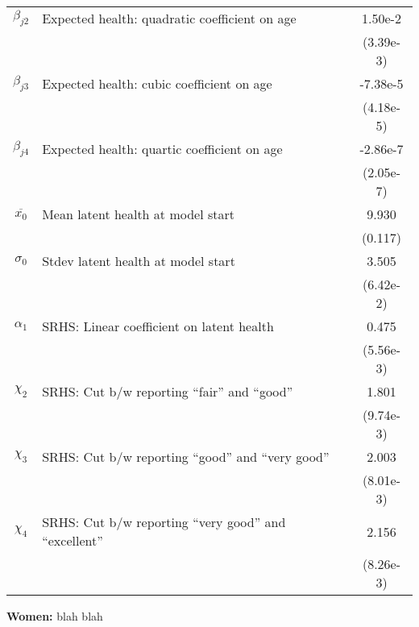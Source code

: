 \begin{table}
\begin{center}
{\begin{tabular}{clc}
$\beta_{j2}$ & Expected health: quadratic coefficient on age & 1.50e-2 \\
 & & (3.39e-3) \\
$\beta_{j3}$ & Expected health: cubic coefficient on age & -7.38e-5 \\
 & & (4.18e-5) \\
$\beta_{j4}$ & Expected health: quartic coefficient on age & -2.86e-7 \\
 & & (2.05e-7) \\
$\overline{x_0}$ & Mean latent health at model start & 9.930 \\
 & & (0.117) \\
$\sigma_{0}$ & Stdev latent health at model start & 3.505 \\
 & & (6.42e-2) \\
$\alpha_1$ & SRHS: Linear coefficient on latent health & 0.475 \\
 & & (5.56e-3) \\
$\chi_2$ & SRHS: Cut b/w reporting ``fair'' and ``good'' & 1.801 \\
 & & (9.74e-3) \\
$\chi_3$ & SRHS: Cut b/w reporting ``good'' and ``very good'' & 2.003 \\
 & & (8.01e-3) \\
$\chi_4$ & SRHS: Cut b/w reporting ``very good'' and ``excellent'' & 2.156 \\
 & & (8.26e-3) \\
\hline\hline
\end{tabular}
 } 
 \usebox{\CrossParamsBox}  
\settowidth\TableWidth{\usebox{\CrossParamsBox}} %
\vspace{0.0cm} \parbox{\TableWidth}{
  \begin{flushleft}
\textbf{Women:} blah blah
  \end{flushleft}
}
\end{center}
\end{table}
